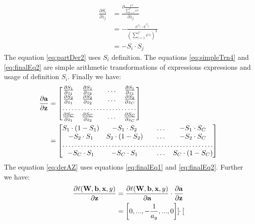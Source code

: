 \documentclass[10pt,a4paper]{article}
\begin{document}
\begin{enumerate}
\begin{align}
\frac{\partial S_i}{\partial z_j} &= 
\frac{\partial \frac{ e^{z_{i}}}{\sum_{l=1}^{C}e^{z_{l}}}}{\partial z_j}
\label{eq:partDer2}\\
&=-\frac{e^{z_{i}}\cdot e^{z_{j}}}{\left(\sum_{l=1}^{C}e^{z_{l}}\right)^2} \label{eq:simpleTrn4}\\
&= -S_i \cdot S_j \label{eq:finalEq2}
\end{align}
The equation \ref{eq:partDer2} uses $S_i$ definition.
The equations \ref{eq:simpleTrn4} and \ref{eq:finalEq2} are simple arithmetic transformations of expressions expressions and usage of definition $S_i$.
Finally  we have:
\begin{align}
\frac{\partial \vect{a}}{\partial \vect{z}}  &=
\begin{bmatrix}
    \frac{\partial S_1}{\partial z_1}     & 
    \frac{\partial S_1}{\partial z_2}      &  & \dots & \frac{\partial S_1}{\partial z_1}  \\
    \frac{\partial S_2}{\partial z_1}     & 
    \frac{\partial S_2}{\partial z_2}      &  & \dots & \frac{\partial S_2}{\partial z_C}\\
    \hdotsfor{5} \\
    \frac{\partial S_C}{\partial z_1}     & 
    \frac{\partial S_C}{\partial z_2}      &  & \dots & \frac{\partial S_C}{\partial z_C}\\
\end{bmatrix} \nonumber \\
&=
\begin{bmatrix}
    S_1 \cdot (1- S_1)    & 
-S_1 \cdot S_2      &  & \dots & -S_1\cdot S_C \\
- S_2 \cdot S_1    & 
S_2 \cdot (1 - S_2)      &  & \dots & -S_2 \cdot S_C \\
    \hdotsfor{5} \\
        -S_C \cdot S_1    & 
-S_C \cdot S_1      &  & \dots & S_C \cdot (1 - S_C) \\
\end{bmatrix}\label{eq:derAZ}
\end{align}
The equation \ref{eq:derAZ} uses equations \ref{eq:finalEq1} and \ref{eq:finalEq2}.
Further we have:
\begin{align}
\frac{\partial \ell(\textbf{\text{{W}}}, \textbf{\text{{b}}}, \textbf{\text{{x}}}, y)}{\partial \textbf{\text{{z}}}} &=
\frac{\partial \ell (\textbf{\text{{W}}}, \textbf{\text{{b}}}, \textbf{\text{{x}}}, y)}{\partial \textbf{\text{{a}}}}
\cdot \frac{\partial \textbf{\text{{a}}}}{\partial \textbf{\text{{z}}}}
\label{eq:derRuleWZ}\\
&= \left[0, ..., -\frac{1}{a_y}, ..., 0\right] \cdot 
\begin{bmatrix}

\end{bmatrix}
\end{align}
\end{enumerate}
\end{document}
